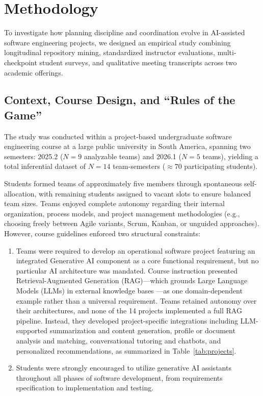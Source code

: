 \section{Methodology}
\label{sec:method}

To investigate how planning discipline and coordination evolve in AI-assisted
software engineering projects, we designed an empirical study combining
longitudinal repository mining, standardized instructor evaluations,
multi-checkpoint student surveys, and qualitative meeting transcripts across
two academic offerings.

\subsection{Context, Course Design, and ``Rules of the Game''}
The study was conducted within a project-based undergraduate software engineering course at a large public university in South America, spanning two semesters: 2025.2 ($N = 9$ analyzable teams) and 2026.1 ($N = 5$ teams), yielding a total inferential dataset of $N = 14$ team-semesters ($\approx 70$ participating students).

Students formed teams of approximately five members through spontaneous self-allocation, with remaining students assigned to vacant slots to ensure balanced team sizes. Teams enjoyed complete autonomy regarding their internal organization, process models, and project management methodologies (e.g., choosing freely between Agile variants, Scrum, Kanban, or unguided approaches). However, course guidelines enforced two structural constraints:
\begin{enumerate}
	\item Teams were required to develop an operational software project featuring an integrated Generative AI component as a core functional requirement, but no particular AI architecture was mandated. Course instruction presented Retrieval-Augmented Generation (RAG)---which grounds Large Language Models (LLMs) in external knowledge bases \cite{lewis2020retrieval}---as one domain-dependent example rather than a universal requirement. Teams retained autonomy over their architectures, and none of the 14 projects implemented a full RAG pipeline. Instead, they developed project-specific integrations including LLM-supported summarization and content generation, profile or document analysis and matching, conversational tutoring and chatbots, and personalized recommendations, as summarized in Table~\ref{tab:projects}.
	\item Students were strongly encouraged to utilize generative AI assistants throughout all phases of software development, from requirements specification to implementation and testing.
\end{enumerate}

